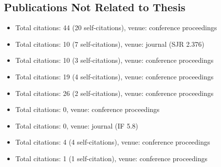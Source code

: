 \begin{refsection}
\section*{Publications Not Related to Thesis}
	\begin{itemize}
		\item{}\par{}Total citations: 44 (20 self-citations), venue: conference proceedings
		\item{}\par{}Total citations: 10 (7 self-citations), venue: journal (SJR 2.376)
		\item{}\par{}Total citations: 10 (3 self-citations), venue: conference proceedings
		\item{}\par{}Total citations: 19 (4 self-citations), venue: conference proceedings
		\item{}\par{}Total citations: 26 (2 self-citations), venue: conference proceedings
		\item{}\par{}Total citations: 0, venue: conference proceedings
		\item{}\par{}Total citations: 0, venue: journal (IF 5.8)
		\item{}\par{}Total citations: 4 (4 self-citations), venue: conference proceedings
		\item{}\par{}Total citations: 1 (1 self-citation), venue: conference proceedings
	\end{itemize}
\end{refsection}

